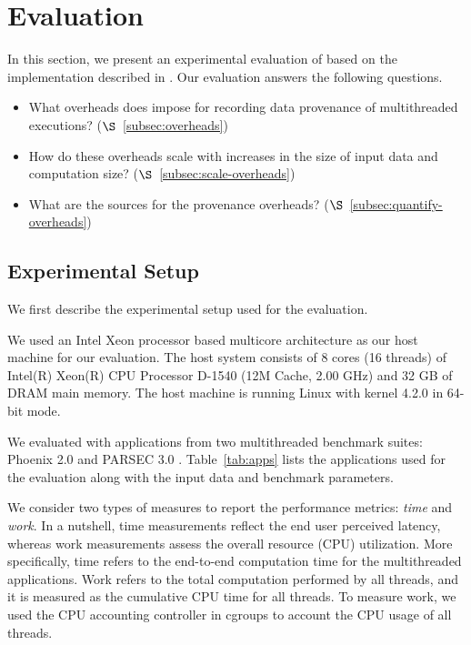 \section{Evaluation}
\label{sec:evaluation}

In this section, we present an experimental evaluation of \projecttitle based on the implementation described in  . Our evaluation answers the following questions.

\begin{itemize}
\item What overheads does \projecttitle impose for recording data provenance of multithreaded executions? ($\S$~\ref{subsec:overheads})
\item How do these overheads scale with increases in the size of input data and computation size? ($\S$~\ref{subsec:scale-overheads})
\item What are the sources for the provenance overheads? ($\S$~\ref{subsec:quantify-overheads})
\end{itemize}



\subsection{Experimental Setup}
We first describe the experimental setup used for the evaluation.

 We used an Intel Xeon processor based
multicore architecture as our host machine for our evaluation. The
host system consists of 8 cores (16 threads) of Intel(R) Xeon(R) CPU Processor D-1540
(12M Cache, 2.00 GHz) and 32 GB of DRAM main memory. The host
machine is running Linux with kernel 4.2.0 in 64-bit mode.


  We evaluated \projecttitle with applications from two multithreaded benchmark suites: Phoenix 2.0 \cite{phoenix} and PARSEC 3.0 \cite{parsec}. Table~\ref{tab:apps} lists the applications used for the evaluation along with the input data and benchmark parameters.  





  We consider two types of measures to report the performance metrics: {\em time} and {\em work}. In a nutshell, time measurements reflect the end user perceived latency, whereas work measurements assess the overall resource (CPU) utilization.  More specifically,  time refers to the end-to-end computation time for the multithreaded applications. Work refers to the total computation performed by all threads, and it is measured as the cumulative CPU time for all threads. To measure work, we used the CPU accounting controller in cgroups to account the CPU usage of all threads. 

